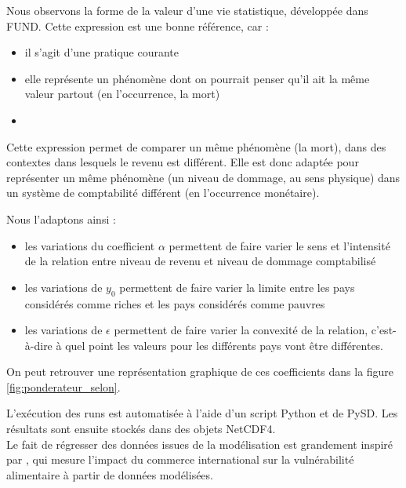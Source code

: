\begin{methodbox}
Nous observons la forme de la valeur d'une vie statistique, développée dans FUND. Cette expression est une bonne référence, car : 

\begin{itemize}
    \item il s'agit d'une pratique courante
    \item elle représente un phénomène dont on pourrait penser qu'il ait la même valeur partout (en l'occurrence, la mort)
    \item 
\end{itemize}

Cette expression permet de comparer un même phénomène (la mort), dans des contextes dans lesquels le revenu est différent. Elle est donc adaptée pour représenter un même phénomène (un niveau de dommage, au sens physique) dans un système de comptabilité différent (en l'occurrence monétaire). 

Nous l'adaptons ainsi : 

\begin{itemize}
    \item les variations du coefficient $\alpha$ permettent de faire varier le sens et l'intensité de la relation entre niveau de revenu et niveau de dommage comptabilisé
    \item les variations de $y_0$ permettent de faire varier la limite entre les pays considérés comme riches et les pays considérés comme pauvres
    \item les variations de $\epsilon$ permettent de faire varier la convexité de la relation, c'est-à-dire à quel point les valeurs pour les différents pays vont être différentes. 
\end{itemize}

On peut retrouver une représentation graphique de ces coefficients dans la figure \ref{fig:ponderateur_selon}.
\vspace{2cm}

\centering

\end{methodbox}
\begin{methodbox}
L'exécution des runs est automatisée à l'aide d'un script Python et de PySD.  Les résultats sont ensuite stockés dans des objets NetCDF4. \\

Le fait de régresser des données issues de la modélisation est grandement inspiré par \textcite{janssens_global_2020}, qui mesure l'impact du commerce international sur la vulnérabilité alimentaire à partir de données modélisées. 

    
\end{methodbox}

